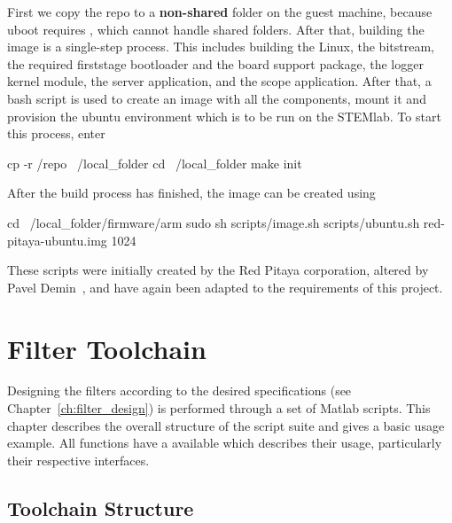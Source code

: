 First  we  copy  the  repo  to  a  \textbf{non-shared}  folder  on  the  guest
machine,  because uboot  requires  , which  cannot handle  shared
folders. After  that,  building the  image  is  a single-step  process.   This
includes building the Linux, the bitstream, the required firststage bootloader
and  the  board  support  package,   the  logger  kernel  module,  the  server
application, and the scope application.  After  that, a bash script is used to
create an  image with all  the components, mount  it and provision  the ubuntu
environment which is to be run on the STEMlab. To start this process, enter
\begin{commandshell}
        cp -r /repo ~/local_folder
        cd ~/local_folder
        make init
\end{commandshell}

After the build process has finished, the image can be created using
\begin{commandshell}
        cd ~/local_folder/firmware/arm
        sudo sh scripts/image.sh scripts/ubuntu.sh red-pitaya-ubuntu.img 1024
\end{commandshell}
\noindent These scripts were initially  created by the Red Pitaya corporation,
altered by  Pavel Demin~\cite{pita:github:pitaya-notes},  and have  again been
adapted to the requirements of this project.
%
%
\chapter{Filter Toolchain} %
\label{ch:devguide:filter_toolchain}

Designing   the  filters   according  to   the  desired   specifications  (see
Chapter~\ref{ch:filter_design})  is   performed  through   a  set   of  Matlab
scripts. This chapter describes the overall  structure of the script suite and
gives a basic usage example. All  functions have a  available which
describes their usage, particularly their respective interfaces. 

\section{Toolchain Structure} %
\label{sec:devguide:filter_toolchain:structure}

